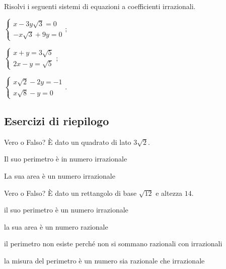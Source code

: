 \begin{esercizio}[\Ast]
 \label{ese:2.89}
Risolvi i seguenti sistemi di equazioni a coefficienti irrazionali.
 \begin{multicols}{2}
 \begin{enumeratea}
 \item $\left\{\begin{array}{l}x-3y\sqrt 3=0\\
 -x\sqrt 3+9y=0 \end{array}\right.;$
 \item $\left\{\begin{array}{l}x+y=3\sqrt 5\\
 2x-y=\sqrt 5 \end{array}\right.;$
 \item $\left\{\begin{array}{l}x\sqrt 2-2y=-1\\
 x\sqrt 8-y=0 \end{array}\right..$
 \end{enumeratea}
 \end{multicols}
\end{esercizio}

\subsection*{Esercizi di riepilogo}

\begin{esercizio}%
Vero o Falso? È dato un quadrato di lato $3\sqrt 2$.

\TabPositions{11.5cm}
 \begin{enumeratea}
 \item Il suo perimetro è in numero irrazionale \tab\boxV\quad\boxF
 \item La sua area è un numero irrazionale\tab\boxV\quad\boxF
 \end{enumeratea}
\end{esercizio}

\begin{esercizio}%
Vero o Falso? È dato un rettangolo di base $\sqrt{12}$ e altezza $14$.

\TabPositions{11.5cm}
 \begin{enumeratea}
 \item il suo perimetro è un numero irrazionale \tab\boxV\quad\boxF
 \item la sua area è un numero razionale \tab\boxV\quad\boxF
 \item il perimetro non esiste perché non si sommano razionali con irrazionali \tab\boxV\quad\boxF
 \item la misura del perimetro è un numero sia razionale che irrazionale \tab\boxV\quad\boxF
 \end{enumeratea}
\end{esercizio}

